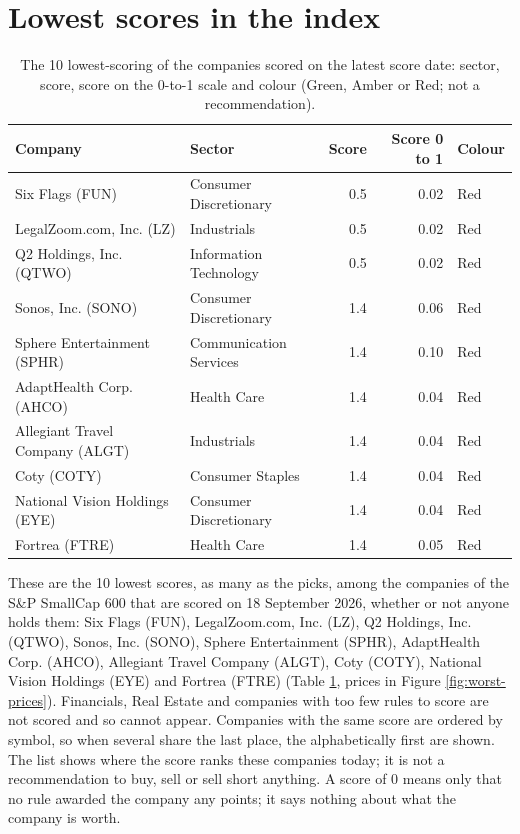 \documentclass[11pt,a4paper]{article}
\begin{document}
\section{Lowest scores in the index}
\label{sec:worst}
\begin{table}[H]
\centering
\small
\caption{The 10 lowest-scoring of the companies scored on the latest score date: sector, score, score on the 0-to-1 scale and colour (Green, Amber or Red; not a recommendation).}\label{tab:worst}
\begin{tabular}{p{4.4cm} p{3cm} r r p{3cm}}
\hline
Company & Sector & Score & Score 0 to 1 & Colour \\
\hline
Six Flags (FUN) & Consumer Discretionary & 0.5 & 0.02 & \cellcolor[HTML]{F4B6B6}Red \\
LegalZoom.com, Inc. (LZ) & Industrials & 0.5 & 0.02 & \cellcolor[HTML]{F4B6B6}Red \\
Q2 Holdings, Inc. (QTWO) & Information Technology & 0.5 & 0.02 & \cellcolor[HTML]{F4B6B6}Red \\
Sonos, Inc. (SONO) & Consumer Discretionary & 1.4 & 0.06 & \cellcolor[HTML]{F4B6B6}Red \\
Sphere Entertainment (SPHR) & Communication Services & 1.4 & 0.10 & \cellcolor[HTML]{F4B6B6}Red \\
AdaptHealth Corp. (AHCO) & Health Care & 1.4 & 0.04 & \cellcolor[HTML]{F4B6B6}Red \\
Allegiant Travel Company (ALGT) & Industrials & 1.4 & 0.04 & \cellcolor[HTML]{F4B6B6}Red \\
Coty (COTY) & Consumer Staples & 1.4 & 0.04 & \cellcolor[HTML]{F4B6B6}Red \\
National Vision Holdings (EYE) & Consumer Discretionary & 1.4 & 0.04 & \cellcolor[HTML]{F4B6B6}Red \\
Fortrea (FTRE) & Health Care & 1.4 & 0.05 & \cellcolor[HTML]{F4B6B6}Red \\
\hline
\end{tabular}
\end{table}
These are the 10 lowest scores, as many as the picks, among the companies of the S\&P SmallCap 600 that are scored on 18 September 2026, whether or not anyone holds them: Six Flags (FUN), LegalZoom.com, Inc. (LZ), Q2 Holdings, Inc. (QTWO), Sonos, Inc. (SONO), Sphere Entertainment (SPHR), AdaptHealth Corp. (AHCO), Allegiant Travel Company (ALGT), Coty (COTY), National Vision Holdings (EYE) and Fortrea (FTRE) (Table \ref{tab:worst}, prices in Figure \ref{fig:worst-prices}). Financials, Real Estate and companies with too few rules to score are not scored and so cannot appear. Companies with the same score are ordered by symbol, so when several share the last place, the alphabetically first are shown. The list shows where the score ranks these companies today; it is not a recommendation to buy, sell or sell short anything. A score of 0 means only that no rule awarded the company any points; it says nothing about what the company is worth.
\end{document}
